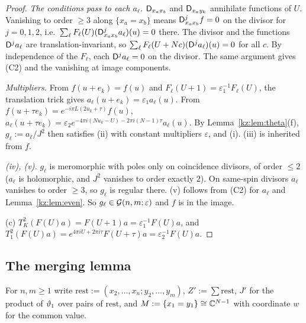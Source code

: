 \begin{proof}
\emph{The conditions pass to each $a_\ell$.} $\mathsf{D}_{x_ax_b}$ and $\mathsf{D}_{x_ay_k}$ annihilate functions of $U$.
Vanishing to order $\ge3$ along $\{x_a=x_b\}$ means $\mathsf{D}_{x_ax_b}^jf=0$ on the divisor for $j=0,1,2$, i.e.\
$\sum_\ell F_\ell(U)(\mathsf{D}^j_{x_ax_b}a_\ell)(u)=0$ there. The divisor and the functions $\mathsf{D}^ja_\ell$ are
translation-invariant, so $\sum_\ell F_\ell(U+Nc)(\mathsf{D}^ja_\ell)(u)=0$ for all $c$. By independence of the $F_\ell$,
each $\mathsf{D}^ja_\ell=0$ on the divisor. The same argument gives (C2) and the vanishing at image components.

\emph{Multipliers.} From $f(u+e_k)=f(u)$ and $F_\ell(U+1)=\varepsilon_1^{-1}F_\ell(U)$, the translation trick gives
$a_\ell(u+e_k)=\varepsilon_1a_\ell(u)$. From $f(u+\tau e_k)=e^{-i\pi L(2u_k+\tau)}f(u)$,
$a_\ell(u+\tau e_k)=\varepsilon_2e^{-4\pi i(Nu_k-U)-2\pi i(N-1)\tau}a_\ell(u)$. By Lemma~\ref{kz:lem:theta}(f),
$g_\ell:=a_\ell/J^2$ then satisfies (ii) with constant multipliers $\varepsilon$, and (i). (iii) is inherited
from $f$.

\emph{(iv), (v).} $g_\ell$ is meromorphic with poles only on coincidence divisors, of order $\le2$
($a_\ell$ is holomorphic, and $J^2$ vanishes to order exactly $2$). On same-spin divisors $a_\ell$ vanishes to
order $\ge3$, so $g_\ell$ is regular there. (v) follows from (C2) for $a_\ell$ and Lemma~\ref{kz:lem:even}.
So $g_\ell\in\mathcal{G}(n,m;\varepsilon)$ and $f$ is in the image.

(c) $T_K^2(F(U)a)=F(U+1)a=\varepsilon_1^{-1}F(U)a$, and
$T_1^2(F(U)a)=e^{4\pi iU+2\pi i\tau}F(U+\tau)a=\varepsilon_2^{-1}F(U)a$.
\end{proof}

\subsection{The merging lemma}\label{kz:sec:C}

For $n,m\ge1$ write $\mathrm{rest}:=(x_2,\dots,x_n;y_2,\dots,y_m)$, $Z':=\sum\mathrm{rest}$, $J'$ for the
product of $\vartheta_1$ over pairs of $\mathrm{rest}$, and $M:=\{x_1=y_1\}\cong\mathbb{C}^{N-1}$ with coordinate $w$ for the
common value.

